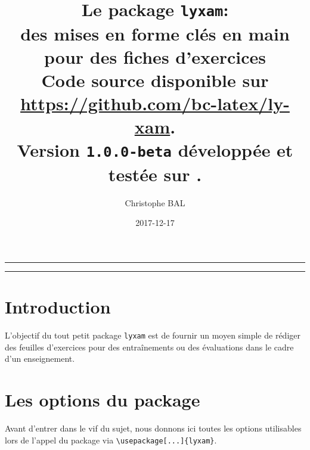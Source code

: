 \documentclass[12pt,a4paper]{scrartcl}
\theoremstyle{definition}
\begin{document}
\renewcommand\labelitemi{\raisebox{0.125em}{\tiny\textbullet}}
\renewcommand{\labelitemii}{---}

\title{%
	Le package \texttt{lyxam}:\\%
	des mises en forme clés en main\\%
	pour des fiches d'exercices\\%
	{\footnotesize Code source disponible sur \url{https://github.com/bc-latex/ly-xam}.}\\%
	{\footnotesize Version \texttt{1.0.0-beta} développée et testée sur \macosxname{}.}%
}
\author{Christophe BAL}
\date{2017-12-17}

\maketitle


\vspace{2em}

\hrule

\tableofcontents

\vspace{1.5em}

\hrule

\newpage



\section{Introduction}

L'objectif du tout petit package \verb+lyxam+ est de fournir un moyen simple de rédiger des feuilles d'exercices pour des entraînements ou des évaluations dans le cadre d'un enseignement.




\section{Les options du package}

Avant d'entrer dans le vif du sujet, nous donnons ici toutes les options utilisables lors de l'appel du package via \verb+\usepackage[...]{lyxam}+.
\end{document}
